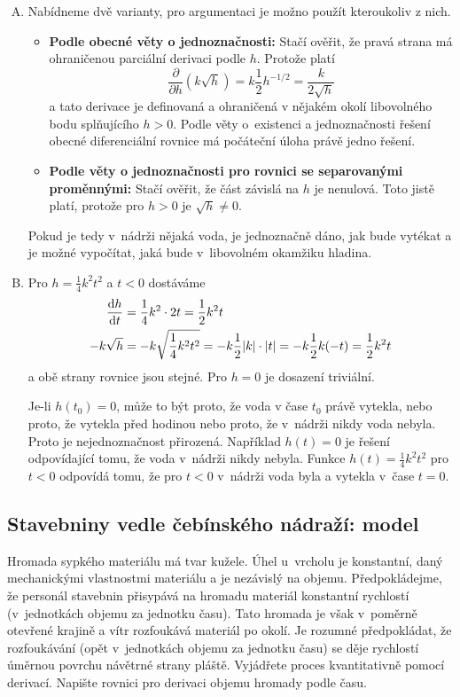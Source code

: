 \reseni
\begin{enumerate}[A)]
\item Nabídneme dvě  varianty, pro argumentaci je možno použít kteroukoliv z nich. 
  \begin{itemize}
  \item \textbf{Podle obecné věty o jednoznačnosti:} Stačí ověřit, že pravá strana má ohraničenou parciální derivaci podle $h$. Protože platí
    $$\frac{\partial }{\partial h}(k\sqrt h)=k\frac 12
    h^{-1/2}=\frac{k}{2\sqrt h}$$ a tato derivace je definovaná a
    ohraničená v nějakém okolí libovolného bodu splňujícího $h>0$.
    Podle věty o existenci a jednoznačnosti řešení obecné
    diferenciální rovnice má počáteční úloha právě jedno řešení.
  \item \textbf{Podle věty o jednoznačnosti pro rovnici se separovanými proměnnými: } Stačí ověřit,
    že část závislá na $h$ je nenulová. Toto jistě platí, protože pro
    $h>0$ je $\sqrt{h}\neq 0$.
\end{itemize}
Pokud je tedy v nádrži nějaká voda, je jednoznačně dáno,
    jak bude vytékat a je možné vypočítat, jaká bude v libovolném
    okamžiku hladina.
  
\item
  Pro $h=\frac 14 k^2 t^2$ a $t<0$ dostáváme
  \begin{equation*}
    \begin{aligned}
      \frac{\mathrm{d}h}{\mathrm{d}t}&=\frac 14 k^2 \cdot 2t = \frac 12 k^2 t\\
      -k\sqrt h&=-k\sqrt{\frac 14 k^2 t^2} = - k \frac 12 |k| \cdot |t| =
      - k \frac 12 k (-t) = \frac 12 k^2 t
    \end{aligned}
  \end{equation*}
  a obě strany rovnice jsou stejné. Pro $h=0$ je dosazení triviální.
  
  Je-li $h(t_0)=0$, může to být proto, že voda v čase $t_0$ právě vytekla, nebo proto, že vytekla před hodinou nebo proto, že v nádrži nikdy voda nebyla. Proto je nejednoznačnost přirozená. Například $h(t)=0$ je řešení odpovídající tomu, že voda v nádrži nikdy nebyla. Funkce $h(t)=\frac 14 k^2t^2$ pro $t<0$ odpovídá tomu, že pro $t<0$ v nádrži voda byla a vytekla v čase $t=0$.
\end{enumerate}

\konec


\stranka



\subsection{Stavebniny vedle čebínského nádraží: model} Hromada sypkého
materiálu má tvar kužele. Úhel u~vrcholu je konstantní, daný
mechanickými vlastnostmi materiálu a je nezávislý na
objemu. Předpokládejme, že personál stavebnin přisypává na hromadu
materiál konstantní rychlostí (v jednotkách objemu za jednotku
času). Tato hromada je však v poměrně otevřené krajině a vítr
rozfoukává materiál po okolí. Je rozumné předpokládat, že rozfoukávání (opět v jednotkách objemu za jednotku
času)
se děje rychlostí úměrnou povrchu návětrné strany pláště. Vyjádřete proces kvantitativně pomocí derivací.
Napište rovnici pro derivaci objemu hromady podle času. 

